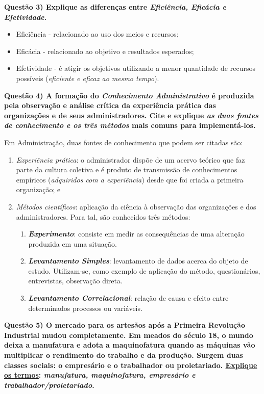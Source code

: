 \documentclass{article}
\begin{document}
\noindent \textbf{Questão 3) Explique as diferenças entre \emph{Eficiência, Eficácia e Efetividade}.}\par
\begin{itemize}
    \item Eficiência - relacionado ao uso dos meios e recursos;
    \item Eficácia - relacionado ao objetivo e resultados esperados;
    \item Efetividade - é atigir os objetivos utilizando a menor quantidade de recursos possíveis (\emph{eficiente e eficaz ao mesmo tempo}).
\end{itemize}
\noindent \textbf{Questão 4) A formação do \emph{Conhecimento Administrativo} é produzida pela observação e análise crítica da experiência prática das organizações e de seus administradores. Cite e explique \emph{as duas fontes de conhecimento e os três métodos} mais comuns para implementá-los.}
\par Em Administração, duas fontes de conhecimento que podem ser citadas são:
\begin{enumerate}
    \item \emph{Experiência prática}: o administrador dispõe de um acervo teórico que faz parte da cultura coletiva e é produto de transmissão de conhecimentos empíricos (\emph{adquiridos com a experiência}) desde que foi criada a primeira organização; e
    \item \emph{Métodos científicos}: aplicação da ciência à observação das organizações e dos administradores. Para tal, são conhecidos três métodos:
          \begin{enumerate}
              \item \textbf{\emph{Experimento}}: consiste em medir as consequências de uma alteração produzida em uma situação.
              \item \textbf{\emph{Levantamento Simples}}: levantamento de dados acerca do objeto de estudo. Utilizam-se, como exemplo de aplicação do método, questionários, entrevistas, observação direta.
              \item \textbf{\emph{Levantamento Correlacional}}: relação de causa e efeito entre determinados processos ou variáveis.
          \end{enumerate}
\end{enumerate}
\pagebreak
\noindent \textbf{Questão 5) O mercado para os artesãos após a Primeira Revolução Industrial mudou completamente. Em meados do século 18, o mundo deixa a manufatura e adota a maquinofatura quando as máquinas vão multiplicar o rendimento do trabalho e da produção. Surgem duas classes sociais: o empresário e o trabalhador ou proletariado.
    \underline{Explique os termos}: \emph{manufatura, maquinofatura, empresário e trabalhador/proletariado}.}
\end{document}
